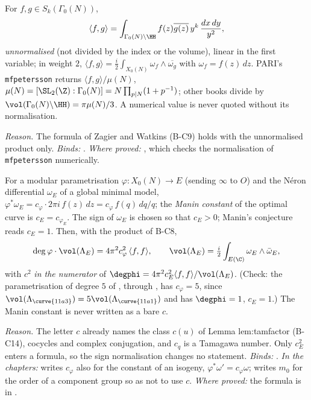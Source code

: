 \begin{convention}\label{conv:notation:bc8}
For $f,g\in S_k(\Gamma_0(N))$,
\[
\langle f,g\rangle=\int_{\Gamma_0(N)\backslash\HH}f(z)\overline{g(z)}\,y^k\,\frac{dx\,dy}{y^2},
\]
\emph{unnormalised} (not divided by the index or the volume), linear in the first variable; in weight $2$,
$\langle f,g\rangle=\frac i2\int_{X_0(N)}\omega_f\wedge\overline{\omega_g}$ with $\omega_f=f(z)\,dz$. PARI's \texttt{mfpetersson} returns
$\langle f,g\rangle/\mu(N)$, $\mu(N)=[\SL_2(\Z):\Gamma_0(N)]=N\prod_{p\mid N}(1+p^{-1})$; other books divide by
$\vol(\Gamma_0(N)\backslash\HH)=\pi\mu(N)/3$. A numerical value is never quoted without its normalisation.
\end{convention}

\noindent\emph{Reason.} The formula of Zagier and Watkins (B-C9) holds with the unnormalised product only.
\emph{Binds:} . \emph{Where proved:}
, which checks the normalisation of \texttt{mfpetersson} numerically.

\begin{convention}\label{conv:notation:bc9}
For a modular parametrisation $\varphi\colon X_0(N)\to E$ (sending $\infty$ to $O$) and the N\'eron differential $\omega_E$ of a global
minimal model, $\varphi^*\omega_E=c_\varphi\cdot2\pi i\,f(z)\,dz=c_\varphi\,f(q)\,dq/q$; the \emph{Manin constant} of the optimal curve is
$c_E=c_{\varphi_E}$. The sign of $\omega_E$ is chosen so that $c_E>0$; Manin's conjecture reads $c_E=1$. Then, with the product of B-C8,
\[
\deg\varphi\cdot\vol(\Lambda_E)=4\pi^2c_\varphi^2\,\langle f,f\rangle,\qquad\vol(\Lambda_E)=\tfrac i2\int_{E(\C)}\omega_E\wedge\bar\omega_E,
\]
with $c^2$ \emph{in the numerator} of $\degphi=4\pi^2c_E^2\langle f,f\rangle/\vol(\Lambda_E)$. (Check: the parametrisation of degree $5$ of
, through , has $c_\varphi=5$, since $\vol(\Lambda_{\curve{11a3}})=5\vol(\Lambda_{\curve{11a1}})$ and  has $\degphi=1$, $c_E=1$.) The Manin constant is
never written as a bare $c$.
\end{convention}

\noindent\emph{Reason.} The letter $c$ already names the class $c(u)$ of Lemma lem:tamfactor (B-C14), cocycles and complex conjugation, and $c_q$ is a Tamagawa number. Only
$c_E^2$ enters a formula, so the sign normalisation changes no statement. \emph{Binds:}
. \emph{In the chapters:}
 writes $c_\varphi$ also for the constant of an isogeny, $\varphi^*\omega'=c_\varphi\omega$;  writes
$m_0$ for the order of a component group so as not to use $c$. \emph{Where proved:} the formula is in .

